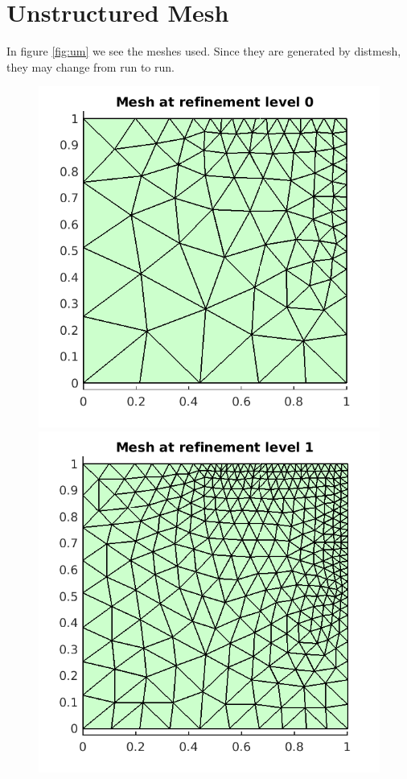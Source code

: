 \documentclass{article}
\begin{document}
\section{Unstructured Mesh}

In figure \ref{fig:um} we see the meshes used.
Since they are generated by distmesh, they may change from run to run.

\begin{figure}[!ht]
\centering
\includegraphics[scale=0.5]{um_1.png}
\includegraphics[scale=0.5]{um_2.png}

\end{figure}
\end{document}
